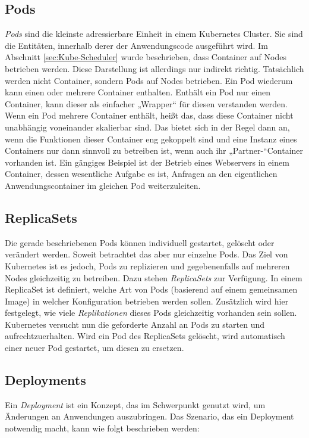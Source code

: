 \documentclass[11pt,a4paper]{article}
\begin{document}
\subsection{Pods}
\emph{Pods} sind die kleinste adressierbare Einheit in einem Kubernetes Cluster. 
Sie sind die Entitäten, innerhalb derer der Anwendungscode ausgeführt wird.
Im Abschnitt \ref{sec:Kube-Scheduler} wurde beschrieben, dass Container auf Nodes betrieben werden.
Diese Darstellung ist allerdings nur indirekt richtig. Tatsächlich werden nicht Container, sondern Pods auf Nodes betrieben.
Ein Pod wiederum kann einen oder mehrere Container enthalten. Enthält ein Pod nur einen Container,
kann dieser als einfacher „Wrapper“ für diesen verstanden werden. 
Wenn ein Pod mehrere Container enthält, heißt das, dass diese Container nicht unabhängig voneinander skalierbar sind.
Das bietet sich in der Regel dann an, wenn die Funktionen dieser Container eng gekoppelt sind und eine Instanz eines
Containers nur dann sinnvoll zu betreiben ist, wenn auch ihr „Partner-“Container vorhanden ist.
Ein gängiges Beispiel ist der Betrieb eines Webservers in einem Container, dessen wesentliche Aufgabe es ist,
Anfragen an den eigentlichen Anwendungscontainer im gleichen Pod weiterzuleiten. 

\subsection{ReplicaSets}
Die gerade beschriebenen Pods können individuell gestartet, gelöscht oder verändert werden.
Soweit betrachtet das aber nur einzelne Pods. Das Ziel von Kubernetes ist es jedoch, 
Pods zu replizieren und gegebenenfalls auf mehreren Nodes gleichzeitig zu betreiben.
Dazu stehen \emph{ReplicaSets} zur Verfügung. 
In einem ReplicaSet ist definiert, welche Art von Pods (basierend auf einem gemeinsamen Image)
in welcher Konfiguration betrieben werden sollen. Zusätzlich wird hier festgelegt, wie viele \emph{Replikationen}
dieses Pods gleichzeitig vorhanden sein sollen.
Kubernetes versucht nun die geforderte Anzahl an Pods zu starten und aufrechtzuerhalten. 
Wird ein Pod des ReplicaSets gelöscht, wird automatisch einer neuer Pod gestartet, um diesen zu ersetzen.

\subsection{Deployments}
Ein \emph{Deployment} ist ein Konzept, das im Schwerpunkt genutzt wird, um Änderungen an Anwendungen auszubringen.
Das Szenario, das ein Deployment notwendig macht, kann wie folgt beschrieben werden:
\end{document}
